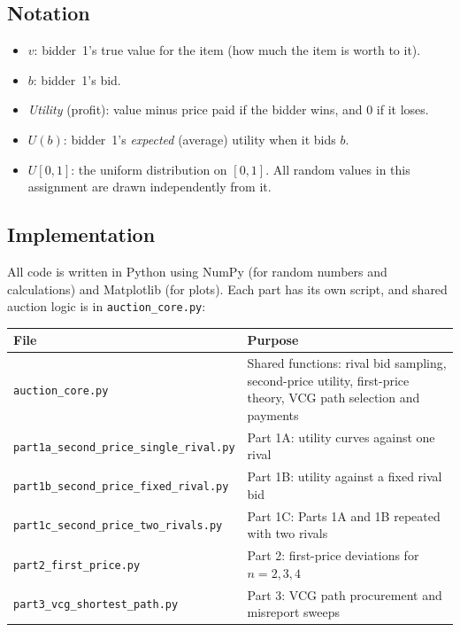 \documentclass[11pt,a4paper]{article}
\begin{document}
\subsection{Notation}

\begin{itemize}
  \item $v$: bidder~1's true value for the item (how much the item is worth to it).
  \item $b$: bidder~1's bid.
  \item \emph{Utility} (profit): value minus price paid if the bidder wins, and $0$ if it loses.
  \item $U(b)$: bidder~1's \emph{expected} (average) utility when it bids $b$.
  \item $U[0,1]$: the uniform distribution on $[0,1]$. All random values in this assignment are drawn independently from it.
\end{itemize}

\subsection{Implementation}

All code is written in Python using NumPy (for random numbers and calculations) and Matplotlib (for plots). Each part has its own script, and shared auction logic is in \texttt{auction\_core.py}:

\begin{table}[H]
\centering
\small
\begin{tabularx}{\linewidth}{lX}
\toprule
File & Purpose\\
\midrule
\texttt{auction\_core.py} & Shared functions: rival bid sampling, second-price utility, first-price theory, VCG path selection and payments\\
\texttt{part1a\_second\_price\_single\_rival.py} & Part 1A: utility curves against one rival\\
\texttt{part1b\_second\_price\_fixed\_rival.py} & Part 1B: utility against a fixed rival bid\\
\texttt{part1c\_second\_price\_two\_rivals.py} & Part 1C: Parts 1A and 1B repeated with two rivals\\
\texttt{part2\_first\_price.py} & Part 2: first-price deviations for $n=2,3,4$\\
\texttt{part3\_vcg\_shortest\_path.py} & Part 3: VCG path procurement and misreport sweeps\\
\bottomrule
\end{tabularx}
\end{table}
\end{document}
